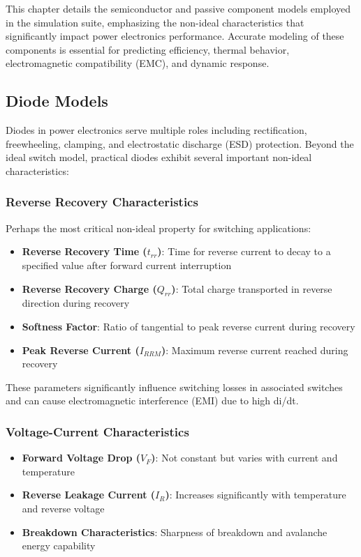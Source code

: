 This chapter details the semiconductor and passive component models employed in the simulation suite, emphasizing the non-ideal characteristics that significantly impact power electronics performance. Accurate modeling of these components is essential for predicting efficiency, thermal behavior, electromagnetic compatibility (EMC), and dynamic response.

\subsection{Diode Models}
Diodes in power electronics serve multiple roles including rectification, freewheeling, clamping, and electrostatic discharge (ESD) protection. Beyond the ideal switch model, practical diodes exhibit several important non-ideal characteristics:

\subsubsection{Reverse Recovery Characteristics}
Perhaps the most critical non-ideal property for switching applications:
\begin{itemize}
    \item \textbf{Reverse Recovery Time ($t_{rr}$)}: Time for reverse current to decay to a specified value after forward current interruption
    \item \textbf{Reverse Recovery Charge ($Q_{rr}$)}: Total charge transported in reverse direction during recovery
    \item \textbf{Softness Factor}: Ratio of tangential to peak reverse current during recovery
    \item \textbf{Peak Reverse Current ($I_{RRM}$)}: Maximum reverse current reached during recovery
\end{itemize}
These parameters significantly influence switching losses in associated switches and can cause electromagnetic interference (EMI) due to high di/dt.

\subsubsection{Voltage-Current Characteristics}
\begin{itemize}
    \item \textbf{Forward Voltage Drop ($V_F$)}: Not constant but varies with current and temperature
    \item \textbf{Reverse Leakage Current ($I_R$)}: Increases significantly with temperature and reverse voltage
    \item \textbf{Breakdown Characteristics}: Sharpness of breakdown and avalanche energy capability
\end{itemize}

